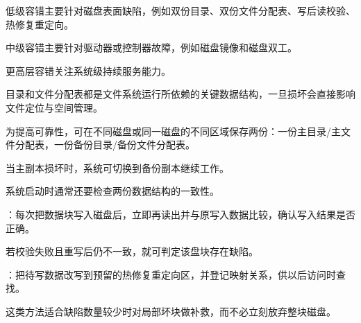 \begin{points}
  \item 低级容错主要针对磁盘表面缺陷，例如双份目录、双份文件分配表、写后读校验、热修复重定向。
  \item 中级容错主要针对驱动器或控制器故障，例如磁盘镜像和磁盘双工。
  \item 更高层容错关注系统级持续服务能力。
\end{points}

\begin{points}
  \item 目录和文件分配表都是文件系统运行所依赖的关键数据结构，一旦损坏会直接影响文件定位与空间管理。
  \item 为提高可靠性，可在不同磁盘或同一磁盘的不同区域保存两份：一份主目录/主文件分配表，一份备份目录/备份文件分配表。
  \item 当主副本损坏时，系统可切换到备份副本继续工作。
  \item 系统启动时通常还要检查两份数据结构的一致性。
\end{points}

\begin{points}
  \item {}：每次把数据块写入磁盘后，立即再读出并与原写入数据比较，确认写入结果是否正确。
  \item 若校验失败且重写后仍不一致，就可判定该盘块存在缺陷。
  \item {}：把待写数据改写到预留的热修复重定向区，并登记映射关系，供以后访问时查找。
  \item 这类方法适合缺陷数量较少时对局部坏块做补救，而不必立刻放弃整块磁盘。
\end{points}


